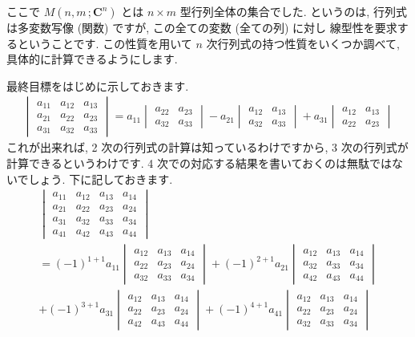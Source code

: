 \documentclass[openany, a4paper, oneside]{jsbook}
\theoremstyle{break}
\theoremstyle{breakdefn}
\begin{document}
ここで $M \left ( n,m \, ; \bm{C}^n \right)$ とは $n \times m$ 型行列全体の集合でした.
というのは,
行列式は多変数写像 (関数) ですが, この全ての変数 (全ての列) に対し
線型性を要求するということです.
この性質を用いて $n$ 次行列式の持つ性質をいくつか調べて, 具体的に計算できるようにします.

最終目標をはじめに示しておきます.
\begin{align}
 \begin{vmatrix} a_{11} & a_{12} & a_{13} \\
  a_{21} & a_{22} & a_{23} \\
  a_{31} & a_{32} & a_{33}
 \end{vmatrix}
 =
 a_{11}
 \begin{vmatrix} a_{22} & a_{23} \\
  a_{32} & a_{33}
 \end{vmatrix}
 -a_{21}
 \begin{vmatrix}
  a_{12} & a_{13} \\
  a_{32} & a_{33}
 \end{vmatrix}
 +a_{31}
 \begin{vmatrix}
  a_{12} & a_{13} \\
  a_{22} & a_{23}
 \end{vmatrix}
\end{align}
これが出来れば, 2 次の行列式の計算は知っているわけですから, 3 次の行列式が計算できるというわけです.
4 次での対応する結果を書いておくのは無駄ではないでしょう. 下に記しておきます.
\begin{gather}
 \begin{vmatrix} a_{11} & a_{12} & a_{13} & a_{14} \\
 a_{21} & a_{22} & a_{23} & a_{24} \\
 a_{31} & a_{32} & a_{33} & a_{34} \\
 a_{41} & a_{42} & a_{43} & a_{44}
 \end{vmatrix}\\
 =
 (-1)^{1+1}a_{11}
 \begin{vmatrix} a_{12} & a_{13} & a_{14} \\
 a_{22} & a_{23} & a_{24} \\
 a_{32} & a_{33} & a_{34}
 \end{vmatrix}
 +(-1)^{2+1}a_{21}
 \begin{vmatrix}
 a_{12} & a_{13} & a_{14} \\
 a_{32} & a_{33} & a_{34} \\
 a_{42} & a_{43} & a_{44}
 \end{vmatrix} \\
 +(-1)^{3+1}a_{31}
 \begin{vmatrix}
 a_{12} & a_{13} & a_{14} \\
 a_{22} & a_{23} & a_{24} \\
 a_{42} & a_{43} & a_{44}
 \end{vmatrix}
 +(-1)^{4+1}a_{41}
 \begin{vmatrix} a_{12} & a_{13} & a_{14} \\
 a_{22} & a_{23} & a_{24} \\
 a_{32} & a_{33} & a_{34}
 \end{vmatrix}
\end{gather}
\end{document}
